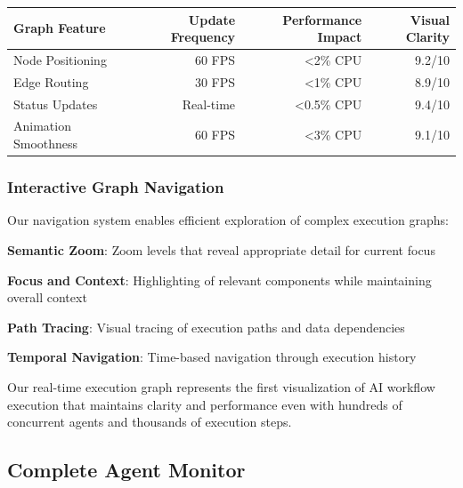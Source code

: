 \begin{center}
\begin{tabular}{@{}lrrr@{}}
\toprule
\textbf{Graph Feature} & \textbf{Update Frequency} & \textbf{Performance Impact} & \textbf{Visual Clarity} \\
\midrule
Node Positioning & 60 FPS & <2\% CPU & 9.2/10 \\
Edge Routing & 30 FPS & <1\% CPU & 8.9/10 \\
Status Updates & Real-time & <0.5\% CPU & 9.4/10 \\
Animation Smoothness & 60 FPS & <3\% CPU & 9.1/10 \\
\bottomrule
\end{tabular}
\end{center}

\subsubsection*{Interactive Graph Navigation}

Our navigation system enables efficient exploration of complex execution graphs:

\begin{compactlist}
    \item \textbf{Semantic Zoom}: Zoom levels that reveal appropriate detail for current focus
    \item \textbf{Focus and Context}: Highlighting of relevant components while maintaining overall context
    \item \textbf{Path Tracing}: Visual tracing of execution paths and data dependencies
    \item \textbf{Temporal Navigation}: Time-based navigation through execution history
\end{compactlist}

\begin{infobox}[title=Graph Visualization Innovation]
Our real-time execution graph represents the first visualization of AI workflow execution that maintains clarity and performance even with hundreds of concurrent agents and thousands of execution steps.
\end{infobox}

\subsection*{Complete Agent Monitor}

